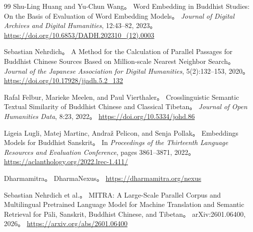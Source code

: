 \documentclass[uplatex,dvipdfmx,11pt,a4paper]{jsarticle}
\begin{document}
\begin{thebibliography}{99}
Shu-Ling Huang and Yu-Chun Wang。
\newblock Word Embedding in Buddhist Studies: On the Basis of Evaluation of Word Embedding Models。
\newblock \textit{Journal of Digital Archives and Digital Humanities}, 12:43--82, 2023。
\newblock \url{https://doi.org/10.6853/DADH.202310_(12).0003}

Sebastian Nehrdich。
\newblock A Method for the Calculation of Parallel Passages for Buddhist Chinese Sources Based on Million-scale Nearest Neighbor Search。
\newblock \textit{Journal of the Japanese Association for Digital Humanities}, 5(2):132--153, 2020。
\newblock \url{https://doi.org/10.17928/jjadh.5.2_132}

Rafal Felbur, Marieke Meelen, and Paul Vierthaler。
\newblock Crosslinguistic Semantic Textual Similarity of Buddhist Chinese and Classical Tibetan。
\newblock \textit{Journal of Open Humanities Data}, 8:23, 2022。
\newblock \url{https://doi.org/10.5334/johd.86}

Ligeia Lugli, Matej Martinc, Andraž Pelicon, and Senja Pollak。
\newblock Embeddings Models for Buddhist Sanskrit。
\newblock In \textit{Proceedings of the Thirteenth Language Resources and Evaluation Conference}, pages 3861--3871, 2022。
\newblock \url{https://aclanthology.org/2022.lrec-1.411/}

Dharmamitra。
\newblock DharmaNexus。
\newblock \url{https://dharmamitra.org/nexus}

Sebastian Nehrdich et al.。
\newblock MITRA: A Large-Scale Parallel Corpus and Multilingual Pretrained Language Model for Machine Translation and Semantic Retrieval for Pāli, Sanskrit, Buddhist Chinese, and Tibetan。
\newblock arXiv:2601.06400, 2026。
\newblock \url{https://arxiv.org/abs/2601.06400}

\end{thebibliography}
\end{document}
